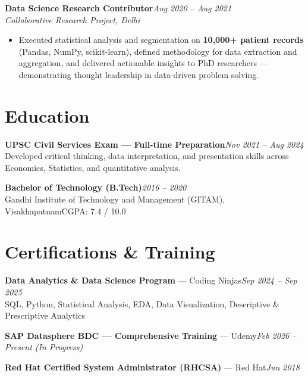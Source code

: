 \documentclass[10pt, letterpaper]{article}
\newcommand{\role}[3]{%
  \vspace{2pt}%
  {\bfseries #1}\hfill{\small\color{muted}\textit{#3}}\\[-2pt]%
  {\small\color{muted}\textit{#2}}%
}
\begin{document}
\role{Data Science Research Contributor}{Collaborative Research Project, Delhi}{Aug 2020 – Aug 2021}

\begin{itemize}
  \item Executed statistical analysis and segmentation on \textbf{10,000+ patient records} (Pandas, NumPy, scikit-learn), defined methodology for data extraction and aggregation, and delivered actionable insights to PhD researchers — demonstrating thought leadership in data-driven problem solving.
\end{itemize}


\section{Education}

{\bfseries UPSC Civil Services Exam — Full-time Preparation}\hfill{\small\color{muted}\textit{Nov 2021 – Aug 2024}}\\
{\small\color{muted}Developed critical thinking, data interpretation, and presentation skills across Economics, Statistics, and quantitative analysis.}

\vspace{2pt}
{\bfseries Bachelor of Technology (B.Tech)}\hfill{\small\color{muted}\textit{2016 – 2020}}\\
{\small\color{muted}Gandhi Institute of Technology and Management (GITAM), Visakhapatnam\hfill CGPA: 7.4 / 10.0}

\section{Certifications \& Training}

{\bfseries Data Analytics \& Data Science Program} — Coding Ninjas\hfill{\small\color{muted}\textit{Sep 2024 – Sep 2025}}\\
{\small\color{muted}SQL, Python, Statistical Analysis, EDA, Data Visualization, Descriptive \& Prescriptive Analytics}

\vspace{1pt}
{\bfseries SAP Datasphere BDC — Comprehensive Training} — Udemy\hfill{\small\color{muted}\textit{Feb 2026 – Present \emph{(In Progress)}}}

\vspace{1pt}
{\bfseries Red Hat Certified System Administrator (RHCSA)} — Red Hat\hfill{\small\color{muted}\textit{Jun 2018}}

\end{document}
